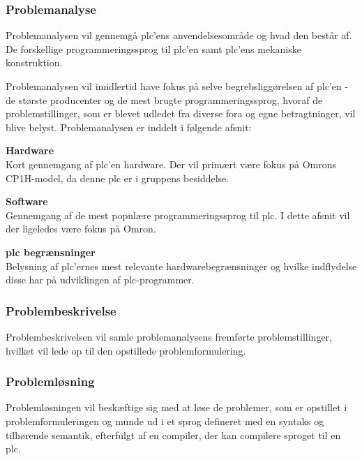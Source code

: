 \label{sec:rapportstruktur}

\subsubsection*{Problemanalyse}
Problemanalysen vil gennemgå \gls{plc}'ens anvendelsesområde og hvad den består af. De forskellige programmeringssprog til \gls{plc}'en samt \gls{plc}'ens mekaniske konstruktion. 

Problemanalysen vil imidlertid have fokus på selve begrebsliggørelsen af \gls{plc}'en - de største producenter og de mest brugte programmeringssprog, hvoraf de problemstillinger, som er blevet udledet fra diverse fora og egne betragtninger, vil blive belyst. Problemanalysen er inddelt i følgende afsnit:

\begin{itemize_small}
    \item \textbf{Hardware} \\
    Kort gennemgang af \gls{plc}'en hardware. Der vil primært være fokus på Omrons CP1H-model, da denne \gls{plc} er i gruppens besiddelse.
    \item \textbf{Software} \\
    Gennemgang af de mest populære programmeringssprog til \gls{plc}. I dette afsnit vil der ligeledes være fokus på Omron.
    \item \textbf{\gls{plc} begrænsninger} \\
    Belysning af \gls{plc}'ernes mest relevante hardwarebegrænsninger og hvilke indflydelse disse har på udviklingen af \gls{plc}-programmer.
\end{itemize_small}

\subsubsection*{Problembeskrivelse}
Problembeskrivelsen vil samle problemanalysens fremførte problemstillinger, hvilket vil lede op til den opstillede problemformulering.

\subsubsection*{Problemløsning}
Problemløsningen vil beskæftige sig med at løse de problemer, som er opstillet i problemformuleringen og munde ud i et sprog defineret med en syntaks og tilhørende semantik, efterfulgt af en compiler, der kan compilere sproget til en \gls{plc}.

